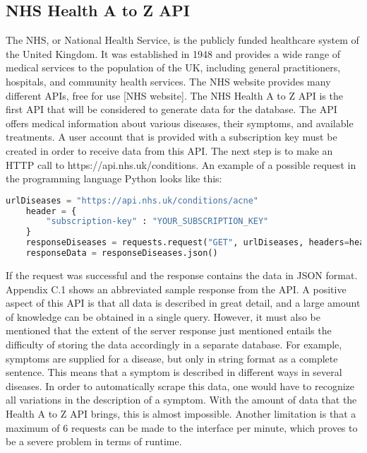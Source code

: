 \subsection{NHS Health A to Z API}
The NHS, or National Health Service, is the publicly funded healthcare system of the United Kingdom. It was established in 1948 and provides a wide range of medical services to the population of the UK, including general practitioners, hospitals, and community health services. The NHS website provides many different APIs, free for use [NHS website]. The NHS Health A to Z API is the first API that will be considered to generate data for the database.
\newline
The API offers medical information about various diseases, their symptoms, and available treatments. A user account that is provided with a subscription key must be created in order to receive data from this API. The next step is to make an HTTP call to https://api.nhs.uk/conditions. An example of a possible request in the programming language Python looks like this:
\begin{lstlisting}[language=Python, caption={Example Python Request for the Health A to Z API}]
	urlDiseases = "https://api.nhs.uk/conditions/acne"
	header = {
		"subscription-key" : "YOUR_SUBSCRIPTION_KEY"
	}
	responseDiseases = requests.request("GET", urlDiseases, headers=header)
	responseData = responseDiseases.json()
\end{lstlisting}
If the request was successful and the response contains the data in JSON format. Appendix C.1 shows an abbreviated sample response from the API. A positive aspect of this API is that all data is described in great detail, and a large amount of knowledge can be obtained in a single query. However, it must also be mentioned that the extent of the server response just mentioned entails the difficulty of storing the data accordingly in a separate database. For example, symptoms are supplied for a disease, but only in string format as a complete sentence. This means that a symptom is described in different ways in several diseases. In order to automatically scrape this data, one would have to recognize all variations in the description of a symptom. With the amount of data that the Health A to Z API brings, this is almost impossible. Another limitation is that a maximum of 6 requests can be made to the interface per minute, which proves to be a severe problem in terms of runtime.


